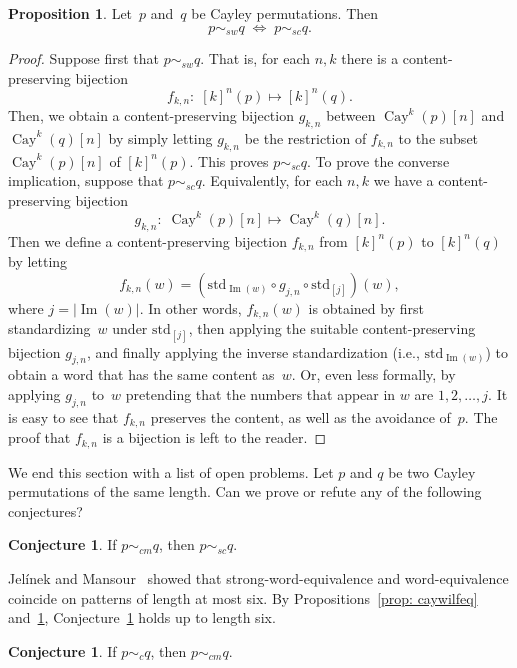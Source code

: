 \documentclass[a4paper, 11pt]{article}
\DeclareMathOperator{\Cay}{Cay}
\DeclareMathOperator{\Img}{Im}
\newcommand{\std}{\mathrm{std}}
\theoremstyle{definition}
\newtheorem{conjecture}[theorem]{Conjecture}
\newtheorem{proposition}[theorem]{Proposition}
\begin{document}
\begin{proposition}\label{prop: strongwilfeq}
Let~$p$ and~$q$ be Cayley permutations. Then
$$
p\sim_{sw} q\;\iff\;p\sim_{sc}q.
$$
\end{proposition}
\begin{proof}
Suppose first that $p\sim_{sw} q$. That is, for each $n,k$ there is
a content-preserving bijection
$$
f_{k,n}:\; [k]^n(p)\longmapsto [k]^n(q).
$$
Then, we obtain a content-preserving bijection $g_{k,n}$ between
$\Cay^k(p)[n]$ and $\Cay^k(q)[n]$ by simply letting $g_{k,n}$ be
the restriction of $f_{k,n}$ to the subset $\Cay^k(p)[n]$ of $[k]^n(p)$.
This proves $p\sim_{sc} q$.
To prove the converse implication, suppose that $p\sim_{sc} q$. Equivalently,
for each $n,k$ we have a content-preserving bijection
$$
g_{k,n}:\; \Cay^k(p)[n]\longmapsto \Cay^k(q)[n].
$$
Then we define a content-preserving bijection $f_{k,n}$ from $[k]^n(p)$
to $[k]^n(q)$ by letting
$$
f_{k,n}(w)=
\left(\std_{\Img(w)}\circ g_{j,n}\circ\std_{[j]}\right)(w),
$$
where $j=|\Img(w)|$.
In other words, $f_{k,n}(w)$ is obtained by first standardizing~$w$
under $\std_{[j]}$, then applying the suitable content-preserving
bijection $g_{j,n}$, and finally applying the inverse standardization
(i.e., $\std_{\Img(w)}$) to obtain a word that has the same content as~$w$.
Or, even less formally, by applying $g_{j,n}$ to~$w$ pretending that
the numbers that appear in $w$ are $1,2,\dots,j$.
It is easy to see that $f_{k,n}$ preserves the content, as well as the
avoidance of~$p$. The proof that $f_{k,n}$ is a bijection is left to the
reader. 
\end{proof}

We end this section with a list of open problems.
Let $p$ and $q$ be two Cayley permutations of the same length. Can we prove
or refute any of the following conjectures?

\begin{conjecture}\label{conj: caystrongeq}
If $p\sim_{cm} q$, then $p\sim_{sc} q$.
\end{conjecture}

Jel\'inek and Mansour~\cite{k-ary} showed that strong-word-equivalence
and word-equivalence coincide on patterns of length at most six.
By Propositions~\ref{prop: caywilfeq} and~\ref{prop: strongwilfeq},
Conjecture~\ref{conj: caystrongeq} holds up to length six.

\begin{conjecture}\label{conj: cayleyeq}
If $p\sim_{c} q$, then $p\sim_{cm} q$.
\end{conjecture}
\end{document}

